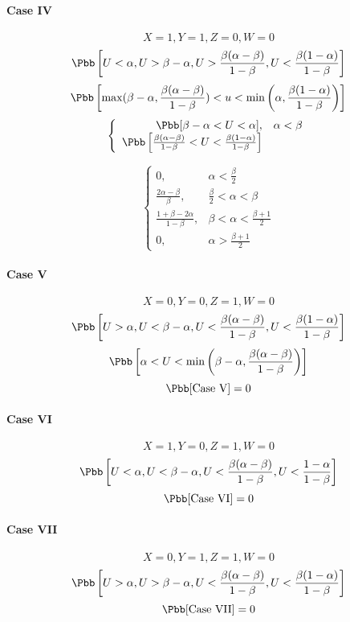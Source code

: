 \paragraph{Case IV}
\[X = 1, Y = 1, Z = 0, W = 0\]
\[\Pbb\left[U < \alpha, U > \beta-\alpha, U > \frac{\beta(\alpha-\beta)}{1-\beta}, U < \frac{\beta(1-\alpha)}{1-\beta}\right]\]
\[\Pbb\left[\max(\beta-\alpha,\frac{\beta(\alpha-\beta)}{1-\beta}) < u < \min\left(\alpha, \frac{\beta(1-\alpha)}{1-\beta}\right)\right]\]
\begin{displaymath}
\left\{\begin{array}{rl}
\Pbb[\beta-\alpha < U < \alpha], & \alpha < \beta\\
\Pbb\left[\frac{\beta(\alpha-\beta)}{1-\beta} < U < \frac{\beta(1-\alpha)}{1-\beta}\right]\\
\end{array}\right.
\end{displaymath}

\begin{displaymath}
\left\{\begin{array}{rl}
0, & \alpha < \frac{\beta}{2}\\
\frac{2\alpha-\beta}{\beta}, & \frac{\beta}{2} < \alpha < \beta\\
\frac{1+\beta-2\alpha}{1-\beta}, & \beta < \alpha < \frac{\beta+1}{2}\\
0, & \alpha > \frac{\beta+1}{2}
\end{array}\right.
\end{displaymath}

\paragraph{Case V}
\[X = 0, Y = 0, Z = 1, W = 0\]
\[\Pbb\left[U > \alpha, U < \beta-\alpha, U < \frac{\beta(\alpha-\beta)}{1-\beta}, U < \frac{\beta(1-\alpha)}{1-\beta}\right]\]
\[\Pbb\left[\alpha < U < \min\left(\beta-\alpha,\frac{\beta(\alpha-\beta)}{1-\beta}\right)\right]\]
\[\Pbb[\mbox{Case V}] = 0\]

\paragraph{Case VI}
\[X = 1, Y = 0, Z = 1, W = 0\]
\[\Pbb\left[U < \alpha, U < \beta-\alpha, U < \frac{\beta(\alpha-\beta)}{1-\beta}, U < \frac{1-\alpha}{1-\beta}\right]\]
\[\Pbb[\mbox{Case VI}] = 0\]

\paragraph{Case VII}
\[X = 0, Y = 1, Z = 1, W = 0\]
\[\Pbb\left[U > \alpha, U > \beta-\alpha, U < \frac{\beta(\alpha-\beta)}{1-\beta}, U < \frac{\beta(1-\alpha)}{1-\beta}\right]\]
\[\Pbb[\mbox{Case VII}] = 0\]

